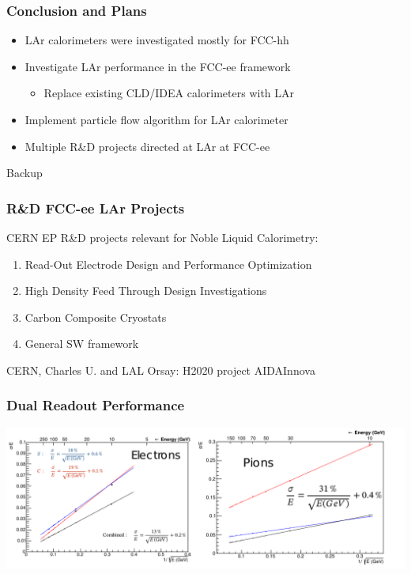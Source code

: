 \documentclass{beamer}
\newcommand{\backupbegin}{%
   \newcounter{finalframe}
   \setcounter{finalframe}{\value{framenumber}}
}
\newcommand{\redtext}[1]{%
  \textcolor{myRed}{#1}
}
\begin{document}
\begin{frame}
  \frametitle{Conclusion and Plans}

  \begin{itemize}
    \item LAr calorimeters were investigated mostly for FCC-hh
    \item Investigate LAr performance in the FCC-ee framework
          \begin{itemize}
            \item Replace existing CLD/IDEA calorimeters with LAr
          \end{itemize}
    \item Implement particle flow algorithm for LAr calorimeter
    \item Multiple R\&D projects directed at LAr at FCC-ee
  \end{itemize}
\end{frame}

\appendix
\backupbegin{}

\begin{frame}[c]
  \begin{center}
    \redtext{\Huge Backup}
  \end{center}
\end{frame}


\begin{frame}
  \frametitle{R\&D FCC-ee LAr Projects}

  CERN EP R\&D projects relevant for Noble Liquid Calorimetry:

  \begin{enumerate}
    \item Read-Out Electrode Design and Performance Optimization
    \item High Density Feed Through Design Investigations
    \item Carbon Composite Cryostats
    \item General SW framework
  \end{enumerate}

  CERN, Charles U. and LAL Orsay: H2020 project AIDAInnova

\end{frame}


\begin{frame}
  \frametitle{Dual Readout Performance}

  \includegraphics[width=\linewidth]{figures/dual_readout_performance.pdf}
\end{frame}
\end{document}
